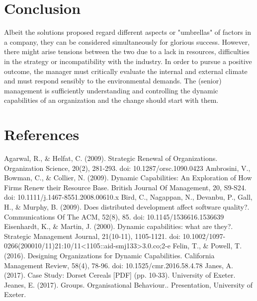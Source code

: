 \documentclass[11pt]{article}
\begin{document}
\section{Conclusion}
Albeit the solutions proposed regard different aspects or "umbrellas" of factors in a company, they can be considered simultaneously for glorious success. However, there might arise tensions between the two due to a lack in resources, difficulties in the strategy or incompatibility with the industry. In order to pursue a positive outcome, the manager must critically evaluate the internal and external climate and must respond sensibly to the environmental demands. The (senior) management is sufficiently understanding and controlling the dynamic capabilities of an organization and the change should start with them.
\newpage
\section{References}
Agarwal, R., \& Helfat, C. (2009). Strategic Renewal of Organizations. Organization Science, 20(2), 281-293. doi: 10.1287/orsc.1090.0423
\newline \newline
Ambrosini, V., Bowman, C., \& Collier, N. (2009). Dynamic Capabilities: An Exploration of How Firms Renew their Resource Base. British Journal Of Management, 20, S9-S24. doi: 10.1111/j.1467-8551.2008.00610.x
\newline \newline
Bird, C., Nagappan, N., Devanbu, P., Gall, H., \& Murphy, B. (2009). Does distributed development affect software quality?. Communications Of The ACM, 52(8), 85. doi: 10.1145/1536616.1536639
\newline \newline
Eisenhardt, K., \& Martin, J. (2000). Dynamic capabilities: what are they?. Strategic Management Journal, 21(10-11), 1105-1121. doi: 10.1002/1097-0266(200010/11)21:10/11<1105::aid-smj133>3.0.co;2-e
\newline \newline
Felin, T., \& Powell, T. (2016). Designing Organizations for Dynamic Capabilities. California Management Review, 58(4), 78-96. doi: 10.1525/cmr.2016.58.4.78
\newline \newline
Janes, A. (2017). Case Study: Dorset Cereals [PDF] (pp. 10-33). University of Exeter.
\newline \newline
Jeanes, E. (2017). Groups. Organisational Behaviour.. Presentation, University of Exeter.
\end{document}

